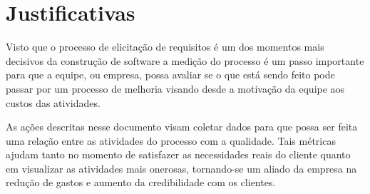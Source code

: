 \chapter{Justificativas}

 Visto que o processo de elicitação de requisitos é um dos momentos mais decisivos da construção de software a medição do processo é um passo importante para que a equipe, ou empresa, possa avaliar se o que está sendo feito pode passar por um processo de melhoria visando desde a motivação da equipe aos custos das atividades.
        
 As ações descritas nesse documento visam coletar dados para que possa ser feita uma relação entre as atividades do processo com a qualidade. Tais métricas ajudam tanto no momento de satisfazer as necessidades reais do cliente quanto em visualizar as atividades mais onerosas, tornando-se um aliado da empresa na redução de gastos e aumento da credibilidade com os clientes.